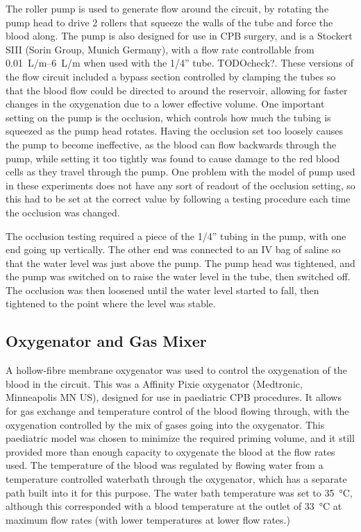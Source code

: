 The roller pump is used to generate flow around the circuit, by rotating the pump head to drive 2 rollers that squeeze the walls of the tube and force the blood along.
The pump is also designed for use in CPB surgery, and is a Stockert SIII (Sorin Group, Munich Germany), with a flow rate controllable from \SIrange{0.01}{6}{L/m} when used with the 1/4'' tube. TODOcheck?.
These versions of the flow circuit included a bypass section controlled by clamping the tubes so that the blood flow could be directed to around the reservoir, allowing for faster changes in the oxygenation due to a lower effective volume.
One important setting on the pump is the occlusion, which controls how much the tubing is squeezed as the pump head rotates.
Having the occlusion set too loosely causes the pump to become ineffective, as the blood can flow backwards through the pump, while setting it too tightly was found to cause damage to the red blood cells as they travel through the pump.
One problem with the model of pump used in these experiments does not have any sort of readout of the occlusion setting, so this had to be set at the correct value by following a testing procedure each time the occlusion was changed.

The occlusion testing required a piece of the 1/4'' tubing in the pump, with one end going up vertically.
The other end was connected to an IV bag of saline so that the water level was just above the pump.
The pump head was tightened, and the pump was switched on to raise the water level in the tube, then switched off.
The occlusion was then loosened until the water level started to fall, then tightened to the point where the level was stable.

\subsection{Oxygenator and Gas Mixer}
A hollow-fibre membrane oxygenator was used to control the oxygenation of the blood in the circuit.
This was a Affinity Pixie oxygenator (Medtronic, Minneapolis MN US), designed for use in paediatric CPB procedures.
It allows for gas exchange and temperature control of the blood flowing through, with the oxygenation controlled by the mix of gases going into the oxygenator.
This paediatric model was chosen to minimize the required priming volume, and it still provided more than enough capacity to oxygenate the blood at the flow rates used.
The temperature of the blood was regulated by flowing water from a temperature controlled waterbath through the oxygenator, which has a separate path built into it for this purpose.
The water bath temperature was set to \SI{35}{\degreeCelsius}, although this corresponded with a blood temperature at the outlet of \SI{33}{\degreeCelsius} at maximum flow rates (with lower temperatures at lower flow rates.)

